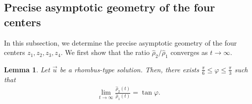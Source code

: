 \documentclass[reqno]{amsart}
\theoremstyle{plain}
\newtheorem{lemma}[theorem]{Lemma}
\theoremstyle{definition}
\numberwithin{equation}{section}
\begin{document}
\subsection{Precise asymptotic geometry of the four centers}

In this subsection, we determine the precise asymptotic geometry of the four centers $z_1,z_2,z_3,z_4$. We first show that the ratio $\hat{\rho}_2/\hat{\rho}_1$ converges as $t\to\infty$.

\begin{lemma}\label{hishinagasalem2}
Let $\vec{u}$ be a rhombus-type solution. Then, there exists $\frac{\pi}{6}\leq \varphi\leq \frac{\pi}{3}$ such that
\begin{align}\label{hoshinohiws1}
\lim_{t\to\infty}\frac{\hat{\rho}_2(t)}{\hat{\rho}_1(t)}=\tan{\varphi}.
\end{align}
\end{lemma}
\end{document}
